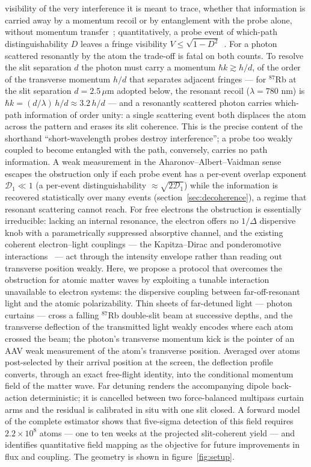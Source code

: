 \documentclass[11pt,a4paper]{article}
\begin{document}
visibility of the very interference it is meant to trace, whether that information is carried away by a momentum recoil or by entanglement with the probe alone, without momentum transfer~\cite{Durr1998, Wiseman1998}; quantitatively, a probe event of which-path distinguishability $D$ leaves a fringe visibility $V \leq \sqrt{1 - D^2}$~\cite{Englert1996}. For a photon scattered resonantly by the atom the trade-off is fatal on both counts. To resolve the slit separation $d$ the photon must carry a momentum $\hbar k \gtrsim h/d$, of the order of the transverse momentum $h/d$ that separates adjacent fringes --- for ${}^{87}$Rb at the slit separation $d = 2.5\,\mu$m adopted below, the resonant recoil ($\lambda = 780$ nm) is $\hbar k = (d/\lambda)\,h/d \approx 3.2\,h/d$ --- and a resonantly scattered photon carries which-path information of order unity: a single scattering event both displaces the atom across the pattern and erases its slit coherence. This is the precise content of the shorthand ``short-wavelength probes destroy interference''; a probe too weakly coupled to become entangled with the path, conversely, carries no path information. A weak measurement in the Aharonov--Albert--Vaidman sense escapes the obstruction only if each probe event has a per-event overlap exponent $\mathcal{D}_1 \ll 1$ (a per-event distinguishability $\approx\sqrt{2\mathcal{D}_1}$) while the information is recovered statistically over many events (section~\ref{sec:decoherence}), a regime that resonant scattering cannot reach. For free electrons the obstruction is essentially irreducible: lacking an internal resonance, the electron offers no $1/\Delta$ dispersive knob with a parametrically suppressed absorptive channel, and the existing coherent electron--light couplings --- the Kapitza--Dirac and ponderomotive interactions~\cite{Freimund2001} --- act through the intensity envelope rather than reading out transverse position weakly. Here, we propose a protocol that overcomes the obstruction for atomic matter waves by exploiting a tunable interaction unavailable to electron systems: the dispersive coupling between far-off-resonant light and the atomic polarizability. Thin sheets of far-detuned light --- photon curtains --- cross a falling ${}^{87}$Rb double-slit beam at successive depths, and the transverse deflection of the transmitted light weakly encodes where each atom crossed the beam; the photon's transverse momentum kick is the pointer of an AAV weak measurement of the atom's transverse position. Averaged over atoms post-selected by their arrival position at the screen, the deflection profile converts, through an exact free-flight identity, into the conditional momentum field of the matter wave. Far detuning renders the accompanying dipole back-action deterministic; it is cancelled between two force-balanced multipass curtain arms and the residual is calibrated in situ with one slit closed. A forward model of the complete estimator shows that five-sigma detection of this field requires $2.2\times 10^8$ atoms --- one to ten weeks at the projected slit-coherent yield --- and identifies quantitative field mapping as the objective for future improvements in flux and coupling. The geometry is shown in figure~\ref{fig:setup}.
\end{document}
